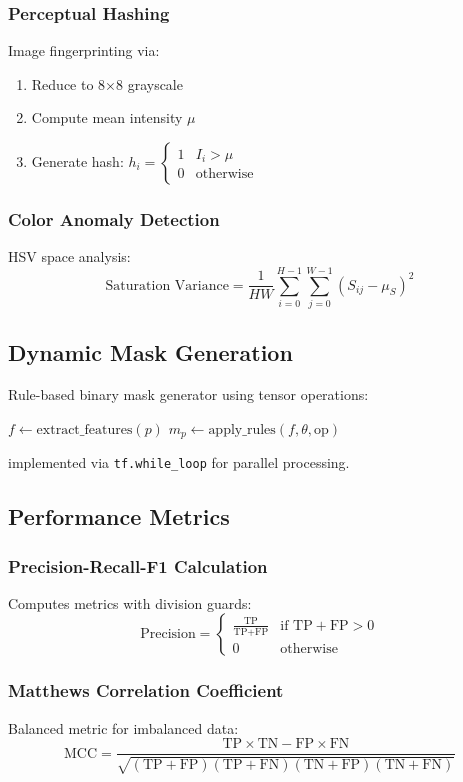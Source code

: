 \documentclass[runningheads]{llncs}
\begin{document}
\subsubsection{Perceptual Hashing}
Image fingerprinting via:
\begin{enumerate}
    \item Reduce to 8×8 grayscale
    \item Compute mean intensity $\mu$
    \item Generate hash: $h_i = \begin{cases} 1 & I_i > \mu \\ 0 & \text{otherwise} \end{cases}$
\end{enumerate}

\subsubsection{Color Anomaly Detection}
HSV space analysis:
\[
\text{Saturation Variance} = \frac{1}{HW}\sum_{i=0}^{H-1}\sum_{j=0}^{W-1} (S_{ij} - \mu_S)^2
\]

\subsection{Dynamic Mask Generation}
Rule-based binary mask generator using tensor operations:
\begin{algorithmic}
    \State $f \gets \text{extract\_features}(p)$
    \State $m_p \gets \text{apply\_rules}(f, \theta, \text{op})$
\EndFor
\end{algorithmic}
implemented via \texttt{tf.while\_loop} for parallel processing.

\subsection{Performance Metrics}

\subsubsection{Precision-Recall-F1 Calculation}
Computes metrics with division guards:
\[
\text{Precision} = \begin{cases} 
      \frac{\text{TP}}{\text{TP} + \text{FP}} & \text{if } \text{TP} + \text{FP} > 0 \\
      0 & \text{otherwise}
   \end{cases}
\]

\subsubsection{Matthews Correlation Coefficient}
Balanced metric for imbalanced data:
\[
\text{MCC} = \frac{\text{TP} \times \text{TN} - \text{FP} \times \text{FN}}{\sqrt{(\text{TP}+\text{FP})(\text{TP}+\text{FN})(\text{TN}+\text{FP})(\text{TN}+\text{FN})}}
\]
\end{document}
